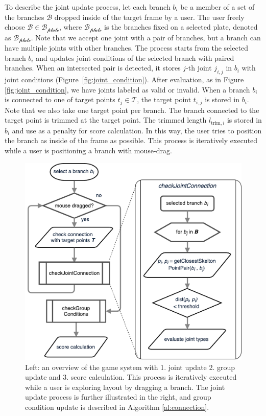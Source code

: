 To describe the joint update process, let each branch $b_i$ be a member of a set of the branches $\mathcal{B}$ dropped inside of the target frame by a user.
The user freely choose $\mathcal{B} \in \mathcal{B_\text{plate}}$, where $\mathcal{B_\text{plate}}$ is the branches fixed on a selected plate, denoted as $\mathcal{B_\text{plate}}$.
Note that we accept one joint with a pair of branches, but a branch can have multiple joints with other branches. 
The process starts from the selected branch $b_i$ and updates joint conditions of the selected branch with paired branches.
When an intersected pair is detected, it stores $j$-th joint $j_{i, j}$ in $b_i$ with joint conditions (Figure~\ref{fig:joint_condition}).
After evaluation, as in Figure \ref{fig:joint_condition},  we have joints labeled as valid or invalid.
When a branch $b_i$ is connected to one of target points $t_j \in \mathcal{T}$, the target point $t_{i, j}$ is stored in $b_i$.
Note that we also take one target point per branch.
The branch connected to the target point is trimmed at the target point.
The trimmed length $l_{\text{trim}, i}$ is stored in $b_i$ and use as a penalty for score calculation.
In this way, the user tries to position the branch as inside of the frame as possible. 
This process is iteratively executed while a user is positioning a branch with mouse-drag.


\begin{figure}[h]
	\begin{center}
		\includegraphics[width = 0.35\paperwidth]{images/system/closestPointAlgorithm.pdf}
		\caption{Left: an overview of the game system with 1. joint update 2. group update and 3. score calculation. This process is iteratively executed while a user is exploring layout by dragging a branch. The joint update process is further illustrated in the right, and group condition update is described in Algorithm \ref{al:connection}. }
		\label{fig:system_flowchart}
	\end{center}
\end{figure}

